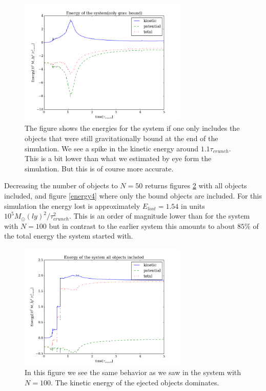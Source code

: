 \documentclass{aa}   %
\begin{document}
\begin{figure}[hbtp]
 \centering
 \includegraphics[width=80mm]{energy2.png}
 \caption[]{\label{energy2}
   The figure shows the energies for the system if one only includes the objects that were still gravitationally bound at the end of the simulation. We see a spike in the kinetic energy around $1.1\tau_{crunch}$. This is a bit lower than what we estimated by eye form the simulation. But this is of course more accurate.
 }
\end{figure}
Decreasing the number of objects to $N=50$ returns figures \ref{energy3} with all objects included, and figure \ref{energy4} where only the bound objects are included. For this simulation the energy lost is approximately $E_{lost} = 1.54$ in units $10^5 M_\odot (ly)^2/\tau_{crunch}^2$. This is an order of magnitude lower than for the system with $N=100$ but in contrast to the earlier system this amounts to about $85\%$ of the total energy the system started with.
\begin{figure}[hbtp]
 \centering
 \includegraphics[width=80mm]{energy3.png}
 \caption[]{\label{energy3}
  In this figure we see the same behavior as we saw in the system with $N=100$. The kinetic energy of the ejected objects dominates. 
 }
\end{figure}
\end{document}
